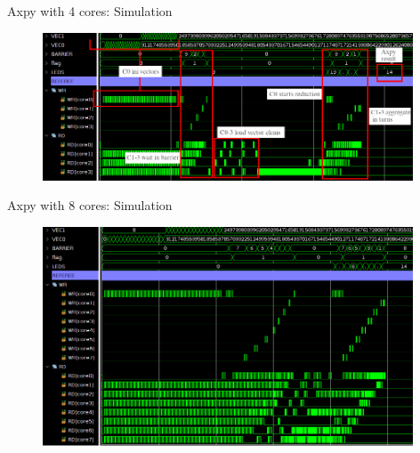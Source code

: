 \begin{frame}{Axpy with 4 cores: Simulation}
\begin{figure}
    \centering
    \includegraphics[width=11cm]{images/axpy_sim4_crop_arrow.png}
    \label{fig:my_label}
\end{figure}
\end{frame}

\begin{frame}{Axpy with 8 cores: Simulation}
\begin{figure}
    \centering
    \includegraphics[width=11cm]{images/axpy_sim8_crop.png}
    \label{fig:my_label}
\end{figure}
\end{frame}
